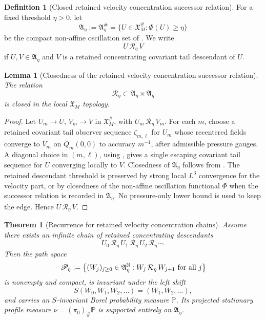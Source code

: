 \documentclass[11pt]{amsart}
\numberwithin{equation}{section}
\theoremstyle{plain}
\newtheorem{theorem}{Theorem}[section]
\newtheorem{lemma}[lemma]{Lemma}
\theoremstyle{definition}
\newtheorem{definition}[definition]{Definition}
\theoremstyle{remark}
\begin{document}
\begin{definition}[Closed retained velocity concentration successor relation]
\label{def:closed-active-successor-relation}
For a fixed threshold \(\eta>0\), let
\[
   \mathfrak A_\eta:=\mathfrak A_\eta^\#
   =
   \{U\in\mathfrak X_M^\#:\Phi(U)\ge\eta\}
\]
be the compact non-affine oscillation set of
.  We write
\[
   U\,\mathcal R_\eta\,V
\]
if \(U,V\in\mathfrak A_\eta\) and \(V\) is a retained concentrating covariant tail
descendant of \(U\).
\end{definition}

\begin{lemma}[Closedness of the retained velocity concentration successor relation]
\label{lem:closed-active-successor-relation}
The relation
\[
   \mathcal R_\eta\subset\mathfrak A_\eta\times\mathfrak A_\eta
\]
is closed in the local \(\mathfrak X_M\) topology.
\end{lemma}

\begin{proof}
Let \(U_m\to U\), \(V_m\to V\) in \(\mathfrak X_M^\#\), with
\(U_m\,\mathcal R_\eta\,V_m\).  For each \(m\), choose a retained covariant tail
observer sequence \(\zeta_{m,\ell}\) for \(U_m\) whose recentered fields converge
to \(V_m\) on \(Q_m(0,0)\) to accuracy \(m^{-1}\), after admissible pressure
gauges.  A diagonal choice in \((m,\ell)\), using
, gives a
single escaping covariant tail sequence for \(U\) converging locally to \(V\).
Closedness of \(\mathfrak A_\eta\) follows from
.  The retained descendant threshold
is preserved by strong local \(L^3\) convergence for the velocity part, or by
closedness of the non-affine oscillation functional \(\Phi\) when the successor
relation is recorded in \(\mathfrak A_\eta\).  No pressure-only lower bound is
used to keep the edge.
Hence \(U\,\mathcal R_\eta\,V\).
\end{proof}

\begin{theorem}[Recurrence for retained velocity concentration chains]
\label{thm:active-path-space-recurrence}
Assume there exists an infinite chain of retained concentrating descendants
\[
   U_0\,\mathcal R_\eta\,U_1\,\mathcal R_\eta\,U_2\,
   \mathcal R_\eta\cdots .
\]
Then the path space
\[
   \mathscr P_\eta
   :=
   \left\{
      (W_j)_{j\ge0}\in\mathfrak A_\eta^{\mathbb N}:
      W_j\,\mathcal R_\eta\,W_{j+1}\ \hbox{for all }j
   \right\}
\]
is nonempty and compact, is invariant under the left shift
\[
   S(W_0,W_1,W_2,\ldots)=(W_1,W_2,\ldots),
\]
and carries an \(S\)-invariant Borel probability measure \(\mathbb P\).  Its
projected stationary profile measure \(\nu=(\pi_0)_\#\mathbb P\) is supported
entirely on \(\mathfrak A_\eta\).
\end{theorem}
\end{document}
